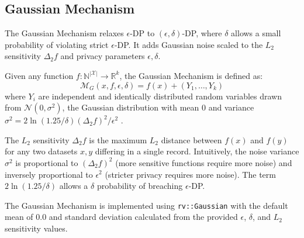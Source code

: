 \subsection{Gaussian Mechanism}
The Gaussian Mechanism relaxes $\epsilon$-DP to $(\epsilon,\delta)$-DP, where $\delta$ allows a small probability of violating strict $\epsilon$-DP. It adds Gaussian noise scaled to the $L_2$ sensitivity $\Delta_2 f$ and privacy parameters $\epsilon, \delta$.

\begin{definition}
Given any function $f: \mathbb{N}^{|\mathcal{X}|} \rightarrow \mathbb{R}^k$, the Gaussian Mechanism is defined as: 
\begin{equation}
\mathcal{M}_G(x, f, \epsilon, \delta) = f(x) + (Y_1, \ldots, Y_k)
\end{equation}
where $Y_i$ are independent and identically distributed random variables drawn from $\mathcal{N}(0, \sigma^2)$, the Gaussian distribution with mean 0 and variance $\sigma^2 = 2\ln(1.25/\delta)(\Delta_2 f)^2 / \epsilon^2$ \citep[Thm. 3.22]{Dwork2014}.
\end{definition}

The $L_2$ sensitivity $\Delta_2 f$ is the maximum $L_2$ distance between $f(x)$ and $f(y)$ for any two datasets $x, y$ differing in a single record. Intuitively, the noise variance $\sigma^2$ is proportional to $(\Delta_2 f)^2$ (more sensitive functions require more noise) and inversely proportional to $\epsilon^2$ (stricter privacy requires more noise). The term $2\ln(1.25/\delta)$ allows a $\delta$ probability of breaching $\epsilon$-DP.

The Gaussian Mechanism is implemented using \texttt{rv::Gaussian} with the default mean of 0.0 and standard deviation calculated from the provided $\epsilon$, $\delta$, and $L_2$ sensitivity values.

